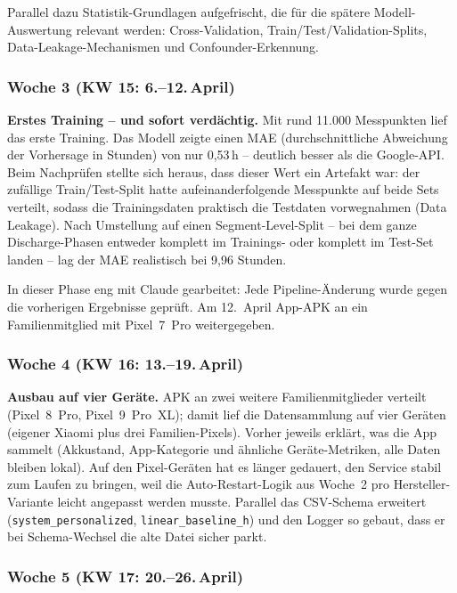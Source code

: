 \documentclass[12pt, a4paper, ngerman]{article}
\newcommand{\code}[1]{\texttt{#1}}
\begin{document}
Parallel dazu Statistik-Grundlagen aufgefrischt, die für die
spätere Modell-Auswertung relevant werden: Cross-Validation,
Train/Test/Validation-Splits, Data-Leakage-Mechanismen und
Confounder-Erkennung.

\subsubsection*{Woche 3 (KW 15: 6.--12.\,April)}

\textbf{Erstes Training -- und sofort verdächtig.}
Mit rund 11.000 Messpunkten lief das erste Training. Das Modell
zeigte einen MAE (durchschnittliche Abweichung der Vorhersage in
Stunden) von nur 0,53\,h -- deutlich besser als die Google-API. Beim Nachprüfen
stellte sich heraus, dass dieser Wert ein Artefakt war: der
zufällige Train/Test-Split hatte aufeinanderfolgende Messpunkte
auf beide Sets verteilt, sodass die Trainingsdaten praktisch die
Testdaten vorwegnahmen (Data Leakage). Nach Umstellung auf einen
Segment-Level-Split -- bei dem ganze Discharge-Phasen entweder
komplett im Trainings- oder komplett im Test-Set landen -- lag
der MAE realistisch bei 9,96 Stunden.

In dieser Phase eng mit Claude gearbeitet: Jede Pipeline-Änderung
wurde gegen die vorherigen Ergebnisse geprüft. Am 12.~April
App-APK an ein Familienmitglied mit Pixel~7~Pro weitergegeben.

\subsubsection*{Woche 4 (KW 16: 13.--19.\,April)}

\textbf{Ausbau auf vier Geräte.}
APK an zwei weitere Familienmitglieder verteilt (Pixel~8~Pro,
Pixel~9~Pro~XL); damit lief die Datensammlung auf vier Geräten
(eigener Xiaomi plus drei Familien-Pixels). Vorher jeweils
erklärt, was die App sammelt
(Akkustand, App-Kategorie und ähnliche Geräte-Metriken, alle
Daten bleiben lokal). Auf den Pixel-Geräten hat es länger
gedauert, den Service stabil zum Laufen zu bringen, weil die
Auto-Restart-Logik aus Woche~2 pro Hersteller-Variante leicht
angepasst werden musste. Parallel das CSV-Schema erweitert
(\code{system\_personalized}, \code{linear\_baseline\_h}) und den
Logger so gebaut, dass er bei Schema-Wechsel die alte Datei
sicher parkt.

\subsubsection*{Woche 5 (KW 17: 20.--26.\,April)}
\end{document}
